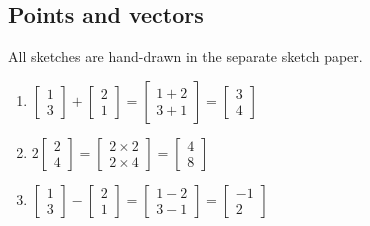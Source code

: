 \subsection{Points and vectors}

\begin{exercise}{1}
  All sketches are hand-drawn in the separate sketch paper.
  
  \begin{enumerate}
  \item $\begin{bmatrix}1\\3\end{bmatrix} +
         \begin{bmatrix}2\\1\end{bmatrix} =
         \begin{bmatrix}1+2\\3+1\end{bmatrix} =
         \begin{bmatrix}3\\4\end{bmatrix}$
  \item $2\begin{bmatrix}2\\4\end{bmatrix} =
         \begin{bmatrix}2 \times 2\\2 \times 4\end{bmatrix} =
         \begin{bmatrix}4\\8\end{bmatrix}$

  \item $\begin{bmatrix}1\\3\end{bmatrix} -
         \begin{bmatrix}2\\1\end{bmatrix} =
         \begin{bmatrix}1-2\\3-1\end{bmatrix} =
         \begin{bmatrix}-1\\2\end{bmatrix}$


\end{enumerate}
\end{exercise}
